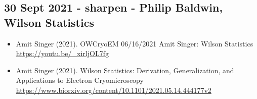 \documentclass[11pt, oneside]{article}   	%
\begin{document}
\subsection{30 Sept 2021 - sharpen - Philip Baldwin, Wilson Statistics}
\begin{itemize}
	\item Amit Singer (2021). OWCryoEM 06/16/2021 Amit Singer: Wilson Statistics \url{https://youtu.be/_xirljOL7fg}
	\item Amit Singer (2021). Wilson Statistics: Derivation, Generalization, and Applications to Electron Cryomicroscopy
 \url{https://www.biorxiv.org/content/10.1101/2021.05.14.444177v2}
\end{itemize}	



\end{document}
